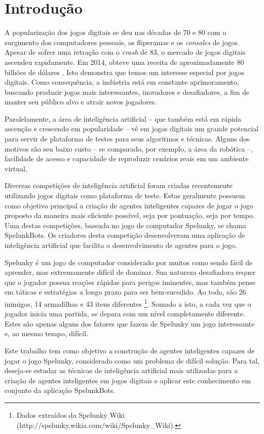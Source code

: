 \chapter{\label{chap:intro}Introdução}
A popularização dos jogos digitais se deu nas décadas de 70 e 80 com o
surgimento dos computadores pessoais, os fliperamas e os \textit{consoles}
de jogos. Apesar de sofrer uma retração com o \textit{crash} de 83, o mercado 
de jogos digitais ascendeu rapidamente. Em 2014, obteve uma receita de
aproximadamente 80 bilhões de dólares \cite{VIDEOGAMEREVENUE}. Isto demonstra
que temos um interesse especial por jogos digitais. Como consequência, a
indústria está em constante aprimoramento, buscando produzir jogos mais
interessantes, inovadores e desafiadores, a fim de manter seu público alvo e
atrair novos jogadores.

Paralelamente, a área de inteligência artificial -- que também está em rápida
ascenção e crescendo em popularidade -- vê em jogos digitais um grande
potencial para servir de plataforma de testes para seus algoritmos e técnicas.
Alguns dos motivos são seu baixo custo -- se comparado, por exemplo, a área da
robótica --, facilidade de acesso e capacidade de reproduzir cenários reais em
um ambiente virtual.

Diversas competições de inteligência artificial foram criadas recentemente
utilizando jogos digitais como plataforma de teste. Estas geralmente possuem
como objetivo principal a criação de agentes inteligentes capazes de jogar o
jogo proposto da maneira mais eficiente possível, seja por pontuação, seja por
tempo. Uma destas competições, baseada no jogo de computador Spelunky, se chama
SpelunkBots. Os criadores desta competição desenvolveram uma aplicação de
inteligência artificial que facilita o desenvolvimento de agentes para o jogo.

Spelunky é um jogo de computador considerado por muitos como sendo fácil de
aprender, mas extremamente difícil de dominar. Sua natureza desafiadora requer
que o jogador possua reações rápidas para perigos iminentes, mas também pense
em táticas e estratégias a longo prazo para ser bem-sucedido. Ao todo, são 26
inimigos, 14 armadilhas e 43 itens diferentes \footnote{Dados extraídos da
Spelunky Wiki (http://spelunky.wikia.com/wiki/Spelunky\_Wiki).}. Somado a isto, a
cada vez que o jogador inicia uma partida, se depara com um nível completamente
diferente. Estes são apenas alguns dos fatores que fazem de Spelunky um jogo
interessante e, ao mesmo tempo, difícil.

Este trabalho tem como objetivo a construção de agentes inteligentes capazes de
jogar o jogo Spelunky, considerado como um problema de difícil solução. Para
tal, deseja-se estudar as técnicas de inteligência artificial mais utilizadas
para a criação de agentes inteligentes em jogos digitais e aplicar este
conhecimento em conjunto da aplicação SpelunkBots.
